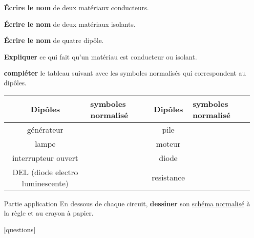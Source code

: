 \documentclass[11pt]{exam}		%
\begin{document}
\begin{questions}
	\question[2] 
	\textbf{Écrire le nom} de deux matériaux conducteurs.
	
	\question[2] 
	\textbf{Écrire le nom} de deux matériaux isolants.
	
	\question[2] 
	\textbf{Écrire le nom} de quatre dipôle.
	
	\question[2] 
	\textbf{Expliquer} ce qui fait qu'un matériau est conducteur ou isolant.
	
	\question[4] 
	\textbf{compléter} le tableau suivant avec les symboles normalisés 
	qui correspondent au dipôles.
    \vspace{20pt}
	\begin{center}
	\begin{tabular}{|c|p{4cm}|c|p{4cm}|}
		\hline
		Dipôles & symboles normalisé & Dipôles & symboles normalisé \\
		\hline
		générateur & \vspace{25pt} & pile  & \\
		\hline
		lampe & \vspace{25pt} & moteur  & \\
		\hline
		interrupteur ouvert & \vspace{25pt} & diode  & \\
		\hline
		DEL (diode electro luminescente) & \vspace{25pt} & resistance  & \\
		\hline
		\end{tabular}
	\end{center}
	
	\vspace{10cm}

	{\huge Partie application}
	\question[8] 
	En dessous de chaque circuit, \textbf{dessiner} son \underline{schéma normalisé} à la règle et au crayon à papier.
	\begin{figure*}[hb]
		\centering		
		\hspace{5cm}
	\vspace{6cm}
		\centering		
		\hspace{5cm}
	\end{figure*}


\end{questions}

\vfill
\begin{center}
\setlength{\doublerulesep}{0.25in}
[questions]
\vspace{-25pt}
\end{center}
\end{document}
